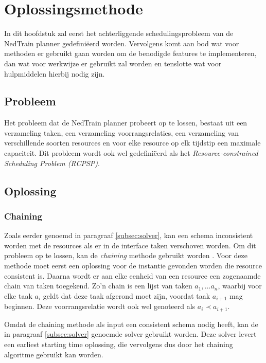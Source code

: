 \section{Oplossingsmethode}
In dit hoofdstuk zal eerst het achterliggende schedulingsprobleem van de NedTrain planner gedefini\"eerd worden. 
Vervolgens komt aan bod wat voor methoden er gebruikt gaan worden om de benodigde features te implementeren, dan wat voor werkwijze er gebruikt zal worden en tenslotte wat voor hulpmiddelen hierbij nodig zijn.

\subsection{Probleem}
Het probleem dat de NedTrain planner probeert op te lossen, bestaat uit een verzameling taken, een verzameling voorrangsrelaties, een verzameling van verschillende soorten resources en voor elke resource op elk tijdstip een maximale capaciteit. Dit probleem wordt ook wel gedefini\"eerd als het \emph{Resource-constrained Scheduling Problem (RCPSP)}. 

\subsection{Oplossing}


\subsubsection*{Chaining}
Zoals eerder genoemd in paragraaf \ref{subsec:solver}, kan een schema inconsistent worden met de resources als er in de interface taken verschoven worden. Om dit probleem op te lossen, kan de \emph{chaining} methode gebruikt worden \cite{policella2007precedence}. Voor deze methode moet eerst een oplossing voor de instantie gevonden worden die resource consistent is. Daarna wordt er aan elke eenheid van een resource een zogenaamde chain van taken toegekend. Zo'n chain is een lijst van taken $a_1, \dots a_n$, waarbij voor elke taak $a_i$ geldt dat deze taak afgerond moet zijn, voordat taak $a_{i+1}$ mag beginnen. Deze voorrangsrelatie wordt ook wel genoteerd als $a_i \prec a_{i+1}$.

Omdat de chaining methode als input een consistent schema nodig heeft, kan de in paragraaf \ref{subsec:solver} genoemde solver gebruikt worden. Deze solver levert een earliest starting time oplossing, die vervolgens dus door het chaining algoritme gebruikt kan worden.


